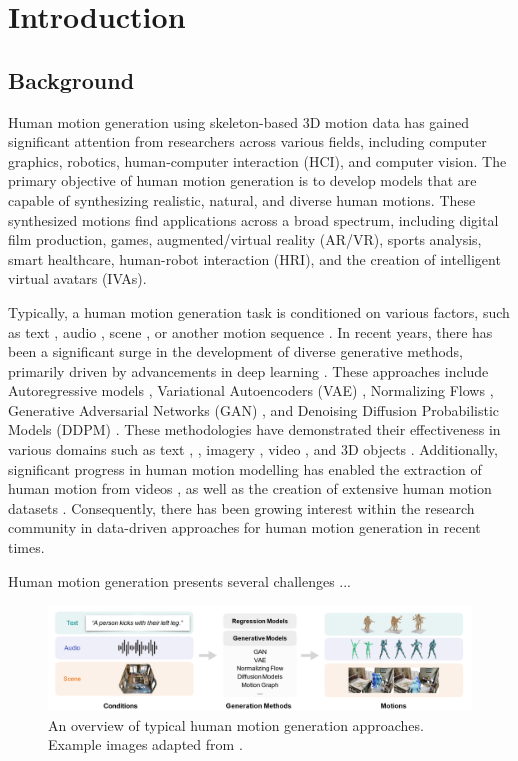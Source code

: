 
\chapter{Introduction}

\section{Background}
Human motion generation using skeleton-based 3D motion data has gained significant attention from researchers across various fields, including computer graphics, robotics, human-computer interaction (HCI), and computer vision. The primary objective of human motion generation is to develop models that are capable of synthesizing realistic, natural, and diverse human motions. These synthesized motions find applications across a broad spectrum, including digital film production, games, augmented/virtual reality (AR/VR), sports analysis, smart healthcare, human-robot interaction (HRI), and the creation of intelligent virtual avatars (IVAs).

Typically, a human motion generation task is conditioned on various factors, such as text \cite{dummy}, audio \cite{dummy}, scene \cite{dummy}, or another motion sequence \cite{dummy}. In recent years, there has been a significant surge in the development of diverse generative methods, primarily driven by advancements in deep learning \cite{dummy}. These approaches include Autoregressive models \cite{dummy}, Variational Autoencoders (VAE) \cite{dummy}, Normalizing Flows \cite{dummy}, Generative Adversarial Networks (GAN) \cite{dummy}, and Denoising Diffusion Probabilistic Models (DDPM) \cite{dummy}. These methodologies have demonstrated their effectiveness in various domains such as text \cite{dummy}, \cite{dummy}, imagery \cite{dummy}, video \cite{dummy}, and 3D objects \cite{dummy}. Additionally, significant progress in human motion modelling \cite{dummy} has enabled the extraction of human motion from videos \cite{dummy}, as well as the creation of extensive human motion datasets \cite{dummy}. Consequently, there has been growing interest within the research community in data-driven approaches for human motion generation in recent times.

Human motion generation presents several challenges ...


\begin{figure}[t]	
	\centering
	\includegraphics[width=1\textwidth]{figures/chapter1/fig_hmg_gan}
	\caption{An overview of typical human motion generation approaches. Example images adapted from \cite{dummy}.}
	\label{fig_hmg_gan}
\end{figure}
 
